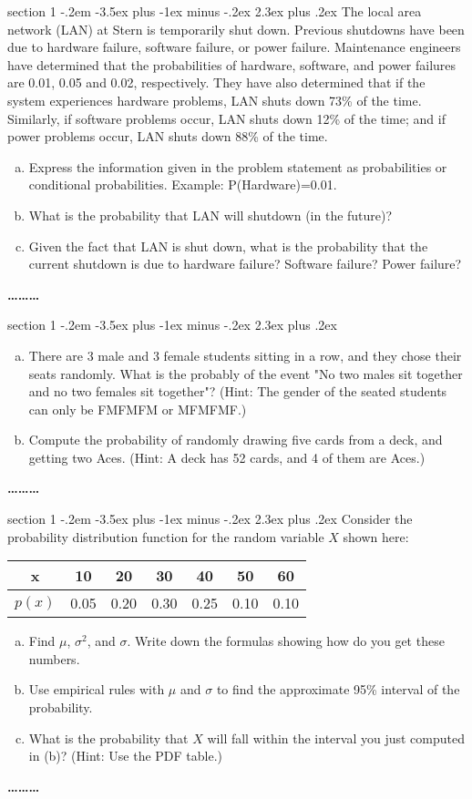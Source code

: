 \documentclass[11pt]{article}
\makeatletter
\newenvironment{problem}{\@startsection
       {section}
       {1}
       {-.2em}
       {-3.5ex plus -1ex minus -.2ex}
       {2.3ex plus .2ex}
       {\pagebreak[3]%
       \large\bf\noindent{Problem }
       }
       }
       {%
       \begin{center}\large\bf \ldots\ldots\ldots\end{center}}
\makeatother
\begin{document}
\begin{problem}{}
The local area network (LAN) at Stern is temporarily shut down. Previous shutdowns have been due to hardware failure, software failure, or power failure. 
Maintenance engineers have determined that the probabilities of hardware, software, and power failures are 0.01, 0.05 and 0.02, respectively.
They have also determined that if the system experiences hardware problems, LAN shuts down 73\% of the time. 
Similarly, if software problems occur, LAN shuts down 12\% of the time; and if power problems occur, LAN shuts down 88\% of the time.
\begin{enumerate}[(a)]
\item Express the information given in the problem statement as probabilities or conditional probabilities. Example: P(Hardware)=0.01.
\item What is the probability that LAN will shutdown (in the future)?
\item Given the fact that LAN is shut down, what is the probability that the current shutdown is due to hardware failure? Software failure? Power failure?
\end{enumerate}
\end{problem}

\begin{problem}{}
\begin{enumerate}[(a)]
\item There are 3 male and 3 female students sitting in a row, and they chose their seats randomly. What is the probably of the event "No two males sit together and no two females sit together"?
(Hint: The gender of the seated students can only be FMFMFM or MFMFMF.)
\item Compute the probability of randomly drawing five cards from a deck, and getting two Aces. (Hint: A deck has 52 cards, and 4 of them are Aces.) 
\end{enumerate}
\end{problem}


\begin{problem}{}
Consider the probability distribution function for the random variable $X$ shown here:
\begin{center}
\begin{tabular}{|c|c|c|c|c|c|c|} \hline
x & 10& 20 &30 &40 &50 &60 \\ \hline
$p(x)$ & 0.05&0.20 &0.30 & 0.25&0.10 &0.10 \\ \hline
\end{tabular}
\end{center}
\begin{enumerate}[(a)]
\item Find $\mu$, $\sigma^2$, and $\sigma$. Write down the formulas showing how do you get these numbers.
\item Use empirical rules with $\mu$ and $\sigma$ to find the approximate 95\% interval of the probability.
\item What is the probability that $X$ will fall within the interval you just computed in (b)? (Hint: Use the PDF table.)
\end{enumerate}
\end{problem}
\end{document}
